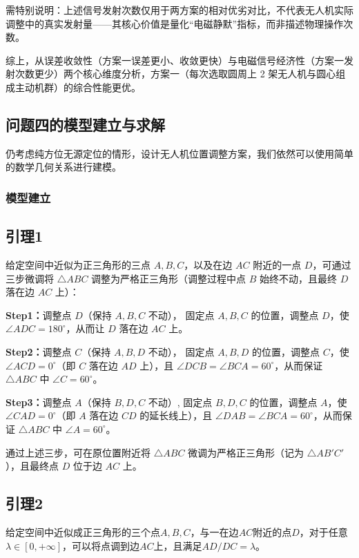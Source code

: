 \documentclass[withoutpreface,bwprint]{cumcmthesis} %
\begin{document}
需特别说明：上述信号发射次数仅用于两方案的相对优劣对比，不代表无人机实际调整中的真实发射量——其核心价值是量化“电磁静默”指标，而非描述物理操作次数。

综上，从误差收敛性（方案一误差更小、收敛更快）与电磁信号经济性（方案一发射次数更少）两个核心维度分析，方案一（每次选取圆周上 2 架无人机与圆心组成主动机群）的综合性能更优。  


\subsection{问题四的模型建立与求解}
仍考虑纯方位无源定位的情形，设计无人机位置调整方案，我们依然可以使用简单的数学几何关系进行建模。
\subsubsection{模型建立}
\subsection*{引理1}
给定空间中近似为正三角形的三点 \( A, B, C \)，以及在边 \( AC \) 附近的一点 \( D \)，可通过三步微调将 \( \triangle ABC \) 调整为严格正三角形（调整过程中点 \( B \) 始终不动，且最终 \( D \) 落在边 \( AC \) 上）：

\textbf{Step1：}调整点 \( D \)（保持 \( A, B, C \) 不动），
固定点 \( A, B, C \) 的位置，调整点 \( D \)，使 \( \angle ADC = 180^\circ \)，从而让 \( D \) 落在边 \( AC \) 上。

\textbf{Step2：}调整点 \( C \)（保持 \( A, B, D \) 不动），
固定点 \( A, B, D \) 的位置，调整点 \( C \)，使 \( \angle ACD = 0^\circ \)（即 \( C \) 落在边 \( AD \) 上），且 \( \angle DCB = \angle BCA = 60^\circ \)，从而保证 \( \triangle ABC \) 中 \( \angle C = 60^\circ \)。

\textbf{Step3：}调整点 \( A \)（保持 \( B, D, C \) 不动）,
固定点 \( B, D, C \) 的位置，调整点 \( A \)，使 \( \angle CAD = 0^\circ \)（即 \( A \) 落在边 \( CD \) 的延长线上），且 \( \angle DAB = \angle BCA = 60^\circ \)，从而保证 \( \triangle ABC \) 中 \( \angle A = 60^\circ \)。

通过上述三步，可在原位置附近将 \( \triangle ABC \) 微调为严格正三角形（记为 \( \triangle AB'C' \)），且最终点 \( D \) 位于边 \( AC \) 上。
\subsection*{引理2}
给定空间中近似成正三角形的三个点\( A,B,C \)，与一在边\( AC \)附近的点\( D \)，对于任意\( \lambda \in [0, +\infty] \)，可以将点调到边\( AC \)上，且满足\( AD/DC = \lambda \)。
\end{document}
